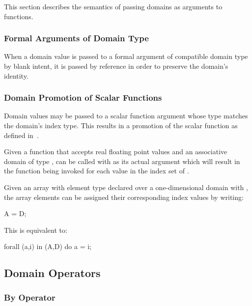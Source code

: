 This section describes the semantics of passing domains as arguments
to functions.

\subsubsection{Formal Arguments of Domain Type}

When a domain value is passed to a formal argument of compatible
domain type by blank intent, it is passed by reference in order to
preserve the domain's identity.



\subsubsection{Domain Promotion of Scalar Functions}
\label{Domain_Promotion_of_Scalar_Functions}

Domain values may be passed to a scalar function argument whose type
matches the domain's index type.  This results in a promotion of the
scalar function as defined in~.

\begin{example}
Given a function  that accepts real floating point values
and an associative domain  of
type ,  can be called with  as
its actual argument which will result in the function being invoked
for each value in the index set of .
\end{example}

\begin{example}
Given an array  with element type  declared over a
one-dimensional domain  with  , the
array elements can be assigned their corresponding index values by
writing:
\begin{chapel}
A = D;
\end{chapel}
This is equivalent to:
\begin{chapel}
forall (a,i) in (A,D) do
  a = i;
\end{chapel}
\end{example}


\subsection{Domain Operators}

\subsubsection{By Operator}
\label{By_Operator_For_Domains}

